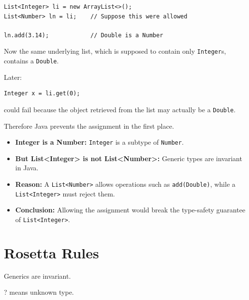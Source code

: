 \documentclass[11pt,a4paper]{book}
\begin{document}
\begin{verbatim}
List<Integer> li = new ArrayList<>();
List<Number> ln = li;    // Suppose this were allowed

ln.add(3.14);            // Double is a Number
\end{verbatim}

Now the same underlying list, which is supposed to contain only
\texttt{Integer}s, contains a \texttt{Double}.

Later:

\begin{verbatim}
Integer x = li.get(0);
\end{verbatim}

could fail because the object retrieved from the list may actually be a
\texttt{Double}.

Therefore Java prevents the assignment in the first place.

\begin{itemize}
    \item \textbf{Integer is a Number:}
    \texttt{Integer} is a subtype of \texttt{Number}.

    \item \textbf{But List<Integer> is not List<Number>:}
    Generic types are invariant in Java.

    \item \textbf{Reason:}
    A \texttt{List<Number>} allows operations such as
    \texttt{add(Double)}, while a \texttt{List<Integer>} must reject them.

    \item \textbf{Conclusion:}
    Allowing the assignment would break the type-safety guarantee of
    \texttt{List<Integer>}.
\end{itemize}

\section{Rosetta Rules}

\begin{rosettarule}

Generics are invariant.

\end{rosettarule}

\begin{rosettarule}

? means unknown type.

\end{rosettarule}
\end{document}
